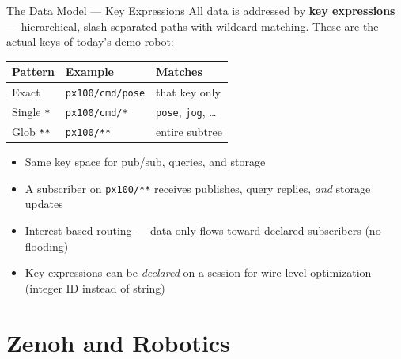 \documentclass[9pt]{beamer}
\begin{document}
\begin{frame}{The Data Model --- Key Expressions}
  All data is addressed by \textbf{key expressions} --- hierarchical, slash-separated paths with wildcard matching. These are the actual keys of today's demo robot:

  \vspace{0.5em}
  \begin{center}
    \ttfamily\small
    \begin{tabular}{lll}
      \textrm{\textbf{Pattern}} & \textrm{\textbf{Example}} & \textrm{\textbf{Matches}} \\
      \midrule
      Exact      & \texttt{px100/cmd/pose}  & that key only \\
      Single \texttt{*}  & \texttt{px100/cmd/*}     & \texttt{pose}, \texttt{jog}, \ldots \\
      Glob \texttt{**}   & \texttt{px100/**}        & entire subtree \\
    \end{tabular}
  \end{center}

  \vspace{1em}
  \begin{itemize}
    \item Same key space for pub/sub, queries, and storage
    \item A subscriber on \texttt{px100/**} receives publishes, query replies, \textit{and} storage updates
    \item Interest-based routing --- data only flows toward declared subscribers (no flooding)
    \item Key expressions can be \textit{declared} on a session for wire-level optimization (integer ID instead of string)
  \end{itemize}
\end{frame}

\section{Zenoh and Robotics}
\end{document}

